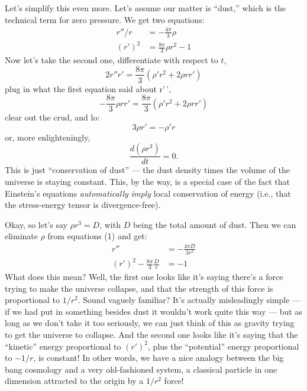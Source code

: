\documentclass[12pt]{article}
\begin{document}
Let's simplify this even more. Let's assume our matter is ``dust,''
which is the technical term for zero pressure. We get two equations:
\[\begin{aligned}r''/r &= -\frac{4\pi}{3}\rho \\ (r')^2 &= \frac{8\pi}{3}\rho r^2-1\end{aligned}\tag{1}\]
Now let's take the second one, differentiate with respect to \(t\),
\[2r''r' = \frac{8\pi}{3}(\rho'r^2 + 2 \rho r r')\] plug in what the
first equation said about r'\,',
\[-\frac{8\pi}{3} \rho r r' = \frac{8\pi}{3}(\rho' r^2 + 2 \rho r r')\]
clear out the crud, and lo: \[3 \rho r' = -\rho' r\] or, more
enlighteningly, \[\frac{d(\rho r^3)}{dt} = 0.\] This is just
``conservation of dust'' --- the dust density times the volume of the
universe is staying constant. This, by the way, is a special case of the
fact that Einstein's equations \emph{automatically imply} local
conservation of energy (i.e., that the stress-energy tensor is
divergence-free).

Okay, so let's say \(\rho r^3 = D\), with \(D\) being the total amount
of dust. Then we can eliminate \(\rho\) from equations (1) and get:
\[\begin{aligned}r'' &= -\frac{4\pi D}{3r^2} \\ (r')^2-\frac{8\pi}{3}\frac{D}{r} &= -1 \end{aligned}\tag{2}\]
What does this mean? Well, the first one looks like it's saying there's
a force trying to make the universe collapse, and that the strength of
this force is proportional to \(1/r^2\). Sound vaguely familiar? It's
actually misleadingly simple --- if we had put in something besides dust
it wouldn't work quite this way --- but as long as we don't take it too
seriously, we can just think of this as gravity trying to get the
universe to collapse. And the second one looks like it's saying that the
``kinetic'' energy proportional to \((r')^2\), plus the ``potential''
energy proportional to \(-1/r\), is constant! In other words, we have a
nice analogy between the big bang cosmology and a very old-fashioned
system, a classical particle in one dimension attracted to the origin by
a \(1/r^2\) force!
\end{document}
